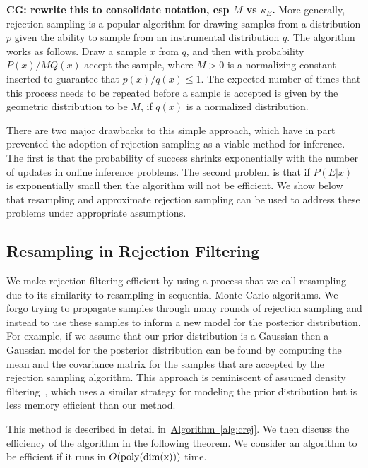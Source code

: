 \documentclass[twoside]{article}
\newcommand{\alg}[1]{\hyperref[alg:#1]{Algorithm~\ref*{alg:#1}}}
\begin{document}
{\bf CG: rewrite this to consolidate notation, esp $M$ vs $\kappa_E$.}
More generally, rejection sampling is a
popular algorithm for drawing samples from a distribution $p$ given the
ability to sample from an instrumental distribution $q$.  The algorithm works
as follows. Draw a sample  $x$ from $q$, and then with probability $P(x)/M
Q(x)$ accept the sample, where $M > 0$ is a normalizing constant inserted to
guarantee that $p(x)/q(x) \le 1$.  The expected number of times that this
process needs to be repeated before a sample is accepted is given by the
geometric distribution to be $M$, if $q(x)$ is a normalized distribution.

There are two major drawbacks to this simple approach, which have in part prevented the adoption
of rejection sampling as a viable method for inference.  The first is that the probability of success shrinks exponentially with the number of updates
in online inference problems.
The second problem is that if $P(E|x)$ is exponentially small then the algorithm will not be efficient.
We show below that resampling and approximate rejection sampling can be used to address 
 these problems under appropriate assumptions.

\subsection{Resampling in Rejection Filtering}
We make rejection filtering efficient by using a process that we call resampling due to
its similarity to resampling in sequential Monte Carlo algorithms.  We
forgo trying to propagate samples through many rounds of rejection sampling and instead
to use these samples to inform a new model for the posterior distribution.  For example, if
we assume that our prior distribution is a Gaussian then a Gaussian model for the posterior
distribution can be found by computing the mean and the covariance matrix for the samples
that are accepted by the rejection sampling algorithm.  This approach is
reminiscent of assumed density filtering~\cite{minka_expectation_2001}, which uses a similar strategy
for modeling the prior distribution but is less memory efficient than
our method.





This method is described in detail in~\alg{crej}. We then discuss the efficiency of the algorithm in the following theorem.
We consider an algorithm to be efficient if it runs in $O(\rm{poly}({\rm dim}(x)))$ time.
\end{document}
